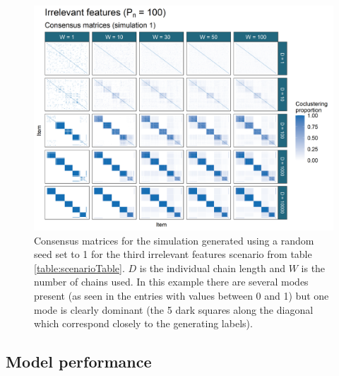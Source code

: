 \documentclass[]{article}
\begin{document}
\begin{figure} %
	\centering
	\includegraphics[scale=0.65]{./Images/Simulations/CMs/irrelevant_features_100Sim1.png}
	\caption{Consensus matrices for the simulation generated using a random seed set to 1 for the third irrelevant features scenario from table \ref{table:scenarioTable}. $D$ is the individual chain length and $W$ is the number of chains used. In this example there are several modes present (as seen in the entries with values between 0 and 1) but one mode is clearly dominant (the 5 dark  squares along the diagonal which correspond closely to the generating labels).}
	\label{fig:simCMsIrr100}
\end{figure}



\subsection{Model performance} \label{sec:simModelPerformance}

%
\end{document}
